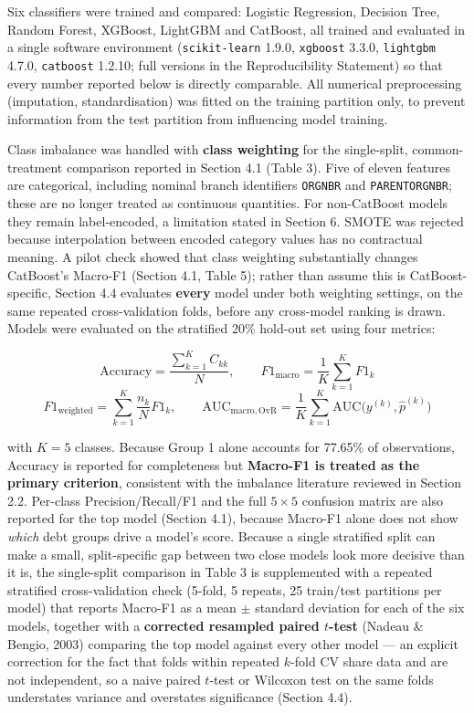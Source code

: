 \documentclass[11pt,a4paper]{article}
\begin{document}
Six classifiers were trained and compared: Logistic Regression, Decision Tree, Random Forest, XGBoost, LightGBM and CatBoost, all trained and evaluated in a single software environment (\texttt{scikit-learn} 1.9.0, \texttt{xgboost} 3.3.0, \texttt{lightgbm} 4.7.0, \texttt{catboost} 1.2.10; full versions in the Reproducibility Statement) so that every number reported below is directly comparable. All numerical preprocessing (imputation, standardisation) was fitted on the training partition only, to prevent information from the test partition from influencing model training.

Class imbalance was handled with \textbf{class weighting} for the single-split, common-treatment comparison reported in Section 4.1 (Table 3). Five of eleven features are categorical, including nominal branch identifiers \texttt{ORGNBR} and \texttt{PARENTORGNBR}; these are no longer treated as continuous quantities. For non-CatBoost models they remain label-encoded, a limitation stated in Section 6. SMOTE was rejected because interpolation between encoded category values has no contractual meaning. A pilot check showed that class weighting substantially changes CatBoost's Macro-F1 (Section 4.1, Table 5); rather than assume this is CatBoost-specific, Section 4.4 evaluates \textbf{every} model under both weighting settings, on the same repeated cross-validation folds, before any cross-model ranking is drawn. Models were evaluated on the stratified 20\% hold-out set using four metrics:

\[
\mathrm{Accuracy}=\frac{\sum_{k=1}^{K}C_{kk}}{N}, \qquad
F1_{\mathrm{macro}}=\frac{1}{K}\sum_{k=1}^{K}F1_k
\]
\[
F1_{\mathrm{weighted}}=\sum_{k=1}^{K}\frac{n_k}{N}F1_k, \qquad
\mathrm{AUC}_{\mathrm{macro,OvR}}=\frac{1}{K}\sum_{k=1}^{K}\mathrm{AUC}\bigl(y^{(k)},\hat p^{(k)}\bigr)
\]

with $K=5$ classes. Because Group 1 alone accounts for 77.65\% of observations, Accuracy is reported for completeness but \textbf{Macro-F1 is treated as the primary criterion}, consistent with the imbalance literature reviewed in Section 2.2. Per-class Precision/Recall/F1 and the full $5\times5$ confusion matrix are also reported for the top model (Section 4.1), because Macro-F1 alone does not show \textit{which} debt groups drive a model's score. Because a single stratified split can make a small, split-specific gap between two close models look more decisive than it is, the single-split comparison in Table 3 is supplemented with a repeated stratified cross-validation check (5-fold, 5 repeats, 25 train/test partitions per model) that reports Macro-F1 as a mean $\pm$ standard deviation for each of the six models, together with a \textbf{corrected resampled paired $t$-test} (Nadeau \& Bengio, 2003) comparing the top model against every other model --- an explicit correction for the fact that folds within repeated $k$-fold CV share data and are not independent, so a naive paired $t$-test or Wilcoxon test on the same folds understates variance and overstates significance (Section 4.4).
\end{document}
